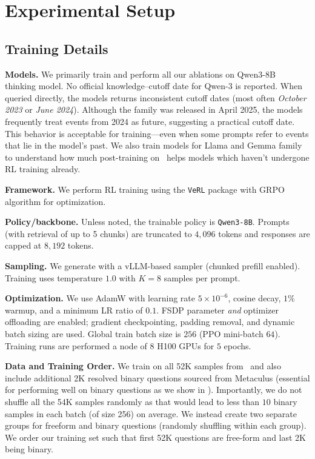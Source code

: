 

\section{Experimental Setup}

\subsection{Training Details}

\label{sec:setupdetails}

\textbf{Models.} We primarily train and perform all our ablations on Qwen3-8B~\citep{yang2025qwen3technicalreport} thinking model. No official knowledge–cutoff date for Qwen-3 is reported. When queried directly, the models returns inconsistent cutoff dates (most often \emph{October 2023} or \emph{June 2024}). 
Although the family was released in April 2025, the models frequently treat events from 2024 as future,  suggesting a practical cutoff date. This behavior is acceptable for training—even when some prompts refer to events that lie in the model’s past. We also train models for Llama and Gemma family to understand how much post-training on \ourdataset \ helps models which haven't undergone RL training already.  

\textbf{Framework.} We perform RL training using the \texttt{VeRL} package with GRPO algorithm \citep{shao2024deepseekmath} for optimization.

\textbf{Policy/backbone.} Unless noted, the trainable policy is \texttt{Qwen3-8B}. Prompts (with retrieval of up to 5 chunks) are truncated to $4{,}096$ tokens and responses are capped at $8{,}192$ tokens.

\textbf{Sampling.} We generate with a vLLM-based sampler (chunked prefill enabled). Training uses temperature $1.0$ with $K{=}8$ samples per prompt. %

\textbf{Optimization.} We use AdamW \citep{loshchilov2017fixing} with learning rate $5{\times}10^{-6}$, cosine decay, $1\%$ warmup, and a minimum LR ratio of $0.1$. FSDP parameter \emph{and} optimizer offloading are enabled; gradient checkpointing, padding removal, and dynamic batch sizing are used. Global train batch size is $256$ (PPO mini-batch $64$). Training runs are performed a node of $8$ H100 GPUs for $5$ epochs.

\textbf{Data and Training Order.} We train on all 52K samples from \ourdataset \ and also include additional 2K resolved binary questions sourced from Metaculus (essential for performing well on binary questions as we show in ). Importantly, we do not shuffle all the 54K samples randomly as that would lead to less than $10$ binary samples in each batch (of size 256) on average. We instead create two separate groups for freeform and binary questions (randomly shuffling within each group). We order our training set such that first 52K questions are free-form and last 2K being binary. %

